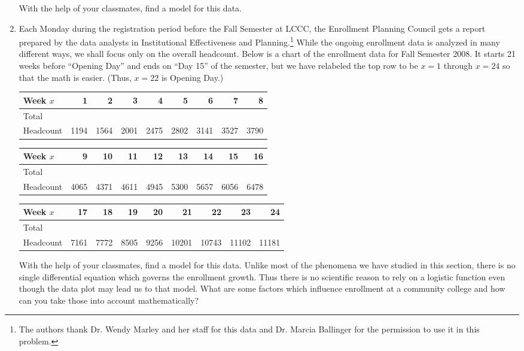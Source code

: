 \begin{enumerate}
With the help of your classmates, find a model for this data.

\item Each Monday during the registration period before the Fall Semester at LCCC, the Enrollment Planning Council gets a report prepared by the data analysts in Institutional Effectiveness and Planning.\footnote{The authors thank Dr. Wendy Marley and her staff for this data and Dr. Marcia Ballinger for the permission to use it in this problem.}  While the ongoing enrollment data is analyzed in many different ways, we shall focus only on the overall headcount.  Below is a chart of the enrollment data for Fall Semester 2008.  It starts 21 weeks before ``Opening Day'' and ends on ``Day 15'' of the semester, but we have relabeled the top row to be $x = 1$ through $x = 24$ so that the math is easier.  (Thus, $x = 22$ is Opening Day.)


\noindent \begin{tabular}{|l|r|r|r|r|r|r|r|r|} \hline
Week $x$ & 1 & 2 & 3 & 4 & 5 & 6 & 7 & 8 \\ \hline 
Total  & & & & & & & & \\
Headcount & 1194 & 1564 & 2001 & 2475 & 2802 & 3141 & 3527 & 3790 \\ \hline
\end{tabular}

\medskip

\noindent \begin{tabular}{|l|r|r|r|r|r|r|r|r|} \hline
Week $x$ & 9 & 10 & 11 & 12 & 13 & 14 & 15 & 16 \\ \hline 
Total  & & & & & & & & \\
Headcount & 4065 & 4371 & 4611 & 4945 & 5300 & 5657 & 6056 & 6478 \\ \hline
\end{tabular}

\medskip

\noindent \begin{tabular}{|l|r|r|r|r|r|r|r|r|} \hline
Week $x$ & 17 & 18 & 19 & 20 & 21 & 22 & 23 & 24\\ \hline 
Total  & & & & & & & & \\
Headcount & 7161 & 7772 & 8505 & 9256 & 10201 & 10743 & 11102 & 11181 \\ \hline
\end{tabular}

\medskip

With the help of your classmates, find a model for this data.  Unlike most of the phenomena we have studied in this section, there is no single differential equation which governs the enrollment growth.  Thus there is no scientific reason to rely on a logistic function even though the data plot may lead us to that model.  What are some factors which influence enrollment at a community college and how can you take those into account mathematically?  


\end{enumerate}
